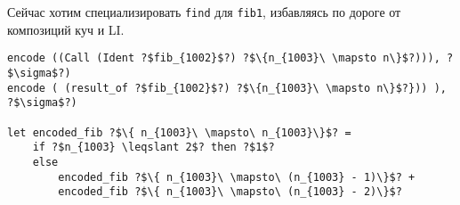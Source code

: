\documentclass{article}
\begin{document}
Сейчас хотим специализировать \texttt{find} для \texttt{fib1}, избавляясь по дороге от композиций куч и LI.

\begin{verbatim}
encode ((Call (Ident ?$fib_{1002}$?) ?$\{n_{1003}\ \mapsto n\}$?))), ?$\sigma$?)
encode ( (result_of ?$fib_{1002}$?) ?$\{n_{1003}\ \mapsto n\}$?})) ), ?$\sigma$?)

let encoded_fib ?$\{ n_{1003}\ \mapsto\ n_{1003}\}$? = 
    if ?$n_{1003} \leqslant 2$? then ?$1$?
    else 
        encoded_fib ?$\{ n_{1003}\ \mapsto\ (n_{1003} - 1)\}$? +  
        encoded_fib ?$\{ n_{1003}\ \mapsto\ (n_{1003} - 2)\}$?
\end{verbatim}


% 
% 
% 
\end{document}
